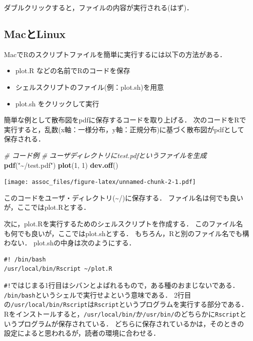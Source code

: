 \documentclass[
]{article}
\newenvironment{Shaded}{\begin{snugshade}}{\end{snugshade}}
\newcommand{\CommentTok}[1]{\textcolor[rgb]{0.56,0.35,0.01}{\textit{#1}}}
\newcommand{\DecValTok}[1]{\textcolor[rgb]{0.00,0.00,0.81}{#1}}
\newcommand{\FunctionTok}[1]{\textcolor[rgb]{0.13,0.29,0.53}{\textbf{#1}}}
\newcommand{\NormalTok}[1]{#1}
\newcommand{\StringTok}[1]{\textcolor[rgb]{0.31,0.60,0.02}{#1}}
\providecommand{\tightlist}{%
  \setlength{\itemsep}{0pt}\setlength{\parskip}{0pt}}
\begin{document}
ダブルクリックすると，ファイルの内容が実行される(はず)．

\hypertarget{macux3068linux}{%
\subsection{MacとLinux}\label{macux3068linux}}

MacでRのスクリプトファイルを簡単に実行するには以下の方法がある．

\begin{itemize}
\tightlist
\item
  plot.R などの名前でRのコードを保存\\
\item
  シェルスクリプトのファイル(例：plot.sh)を用意\\
\item
  plot.sh をクリックして実行
\end{itemize}

簡単な例として散布図をpdfに保存するコードを取り上げる．
次のコードをRで実行すると，乱数(x軸：一様分布，y軸：正規分布)に基づく散布図がpdfとして保存される．

\begin{Shaded}
\begin{Highlighting}[]
\CommentTok{\# コード例}
  \CommentTok{\# ユーザディレクトリにtest.pdfというファイルを生成}
\FunctionTok{pdf}\NormalTok{(}\StringTok{"\textasciitilde{}/test.pdf"}\NormalTok{)}
  \FunctionTok{plot}\NormalTok{(}\DecValTok{1}\NormalTok{, }\DecValTok{1}\NormalTok{)}
\FunctionTok{dev.off}\NormalTok{()}
\end{Highlighting}
\end{Shaded}

\texttt{[image: assoc\_files/figure-latex/unnamed-chunk-2-1.pdf]}

このコードをユーザ・ディレクトリ(\textasciitilde/)に保存する．
ファイル名は何でも良いが，ここではplot.Rとする．

次に，plot.Rを実行するためのシェルスクリプトを作成する．
このファイル名も何でも良いが，ここではplot.shとする．
もちろん，Rと別のファイル名でも構わない．
plot.shの中身は次のようにする．

\begin{verbatim}
#! /bin/bash
/usr/local/bin/Rscript ~/plot.R
\end{verbatim}

\texttt{\#!}ではじまる1行目はシバンとよばれるもので，ある種のおまじないである．
\texttt{/bin/bash}というシェルで実行せよという意味である．
2行目の\texttt{/usr/local/bin/Rscript}は\texttt{Rscript}というプログラムを実行する部分である．
Rをインストールすると，\texttt{/usr/local/bin/}か\texttt{/usr/bin/}のどちらかに\texttt{Rscript}というプログラムが保存されている．
どちらに保存されているかは，そのときの設定によると思われるが，読者の環境に合わせる．
\end{document}
